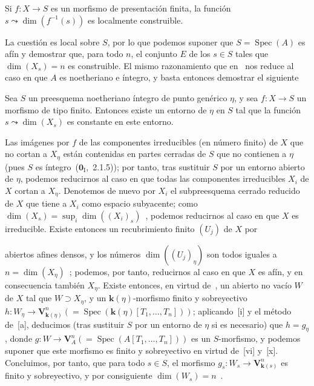 \begin{proposition}[9.2.6.1]
\label{IV.9.2.6.1}
Si $f:X\to S$ es un morfismo de presentación finita, la función $s\leadsto\dim(f^{-1}(s))$ es localmente construible.
\end{proposition}

La cuestión es local sobre $S$, por lo que podemos suponer que $S=\operatorname{Spec}(A)$ es afín y demostrar que, para todo $n$, el conjunto $E$ de los $s\in S$ tales que $\dim(X_s)=n$ es construible.
El mismo razonamiento que en~ nos reduce al caso en que $A$ es noetheriano e íntegro, y basta entonces demostrar el siguiente

\begin{corollary}[9.2.6.2]
\label{IV.9.2.6.2}
Sea $S$ un preesquema noetheriano íntegro de punto genérico $\eta$, y sea $f:X\to S$ un morfismo de tipo finito.
Entonces existe un entorno de $\eta$ en $S$ tal que la función $s\leadsto\dim(X_s)$ es constante en este entorno.
\end{corollary}

Las imágenes por $f$ de las componentes irreducibles (en número finito) de $X$ que no cortan a $X_\eta$ están contenidas en partes cerradas de $S$ que no contienen a $\eta$ (pues $S$ es íntegro~($\mathbf{0}_{\mathrm{I}}$,~2.1.5)); por tanto, tras sustituir $S$ por un entorno abierto de $\eta$, podemos reducirnos al caso en que todas las componentes irreducibles $X_i$ de $X$ cortan a $X_\eta$.
Denotemos de nuevo por $X_i$ el subpreesquema cerrado reducido de $X$ que tiene a $X_i$ como espacio subyacente; como $\dim(X_s)=\sup_i\dim((X_i)_s)$~, podemos reducirnos al caso en que $X$ es irreducible.
Existe entonces un recubrimiento finito $(U_j)$ de $X$ por

abiertos afines densos, y los números $\dim((U_j)_\eta)$ son todos iguales a $n=\dim(X_\eta)$~; podemos, por tanto, reducirnos al caso en que $X$ es afín, y en consecuencia también $X_\eta$.
Existe entonces, en virtud de~, un abierto no vacío $W$ de $X$ tal que $W\supset X_\eta$, y un $\boldsymbol{k}(\eta)$-morfismo finito y sobreyectivo $h:W_\eta\to\mathbf{V}_{\mathbf{k}(\eta)}^n(=\operatorname{Spec}(\boldsymbol{k}(\eta)[T_1,\ldots,T_n]))$; aplicando~[i] y el método de~[a], deducimos (tras sustituir $S$ por un entorno de $\eta$ si es necesario) que $h=g_\eta$, donde $g:W\to\mathbf{V}_A^n(=\operatorname{Spec}(A[T_1,\ldots,T_n]))$ es un $S$-morfismo, y podemos suponer que este morfismo es finito y sobreyectivo en virtud de~[vi] y~[x].
Concluimos, por tanto, que para todo $s\in S$, el morfismo $g_s:W_s\to\mathbf{V}_{\mathbf{k}(s)}^n$ es finito y sobreyectivo, y por consiguiente $\dim(W_s)=n$~.

